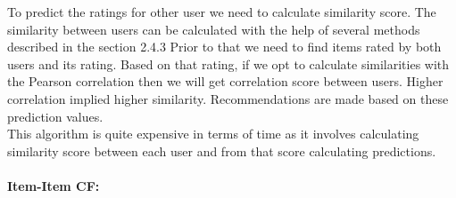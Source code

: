 \noindent To predict the ratings for other user we need to calculate similarity score. The similarity between users can be calculated with the help of several methods described in the section 2.4.3 Prior to that we need to find items rated by both users and its rating. Based on that rating, if we opt to calculate similarities with the Pearson correlation then we will get correlation score between users. Higher correlation implied higher similarity. Recommendations are made based on these prediction values. 
\\
This algorithm is quite expensive in terms of time as it involves calculating similarity score between each user and from that score calculating predictions. 
\\
\noindent \paragraph{Item-Item CF:}

